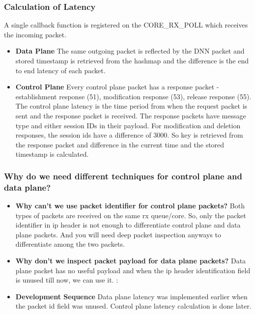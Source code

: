 \documentclass{article}
\begin{document}
\subsubsection{Calculation of Latency}
A single callback function is registered on the CORE\_RX\_POLL which  receives the incoming packet.
\begin{itemize}
    \item \textbf{Data Plane} The same outgoing packet is reflected by the DNN packet and stored timestamp is retrieved from the hashmap and the difference is the end to end latency of each packet.
    \item \textbf{Control Plane} Every control plane packet has a response packet - establishment response (51), modification response (53), release response (55). The control plane latency is the time period from when the request packet is sent and the response packet is received.
          The response packets have message type and either session IDs in their payload. For modification and deletion  responses, the session ids have a difference of 3000. So key is retrieved from the response packet and difference in the current time and the stored timestamp is calculated.
\end{itemize}
\subsubsection{Why do we need different techniques for control plane and data plane?}
\begin{itemize}
    \item \textbf{Why can't we use packet identifier for control plane packets?}
          Both types of packets are received on the same rx queue/core. So, only the packet identifier in ip header is not enough to differentiate control plane and data plane packets. And you will need deep packet inspection anyways to differentiate among the two packets.
    \item \textbf{Why don't we inspect packet payload for data plane packets?} Data plane packet has no useful payload and when the ip header identification field is unused till now, we can use it.
          :\item \textbf{Development Sequence}
          Data plane latency was implemented earlier when the packet id field was unused. Control plane latency calculation is done later.
\end{itemize}
\end{document}
